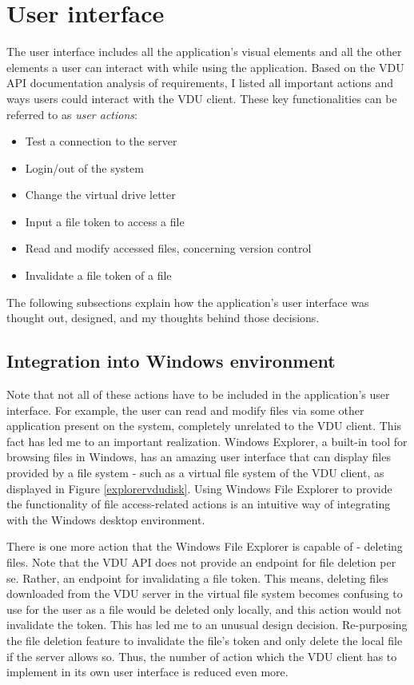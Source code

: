 \section{User interface}
The user interface includes all the application's visual elements and all the other elements a user can interact with while using the application. Based on the VDU API documentation analysis of requirements, I listed all important actions and ways users could interact with the VDU client. These key functionalities can be referred to as \textit{user actions}: 

\begin{itemize}
    \item Test a connection to the server
    \item Login/out of the system
    \item Change the virtual drive letter
    \item Input a file token to access a file
    \item Read and modify accessed files, concerning version control
    \item Invalidate a file token of a file
\end{itemize}

The following subsections explain how the application's user interface was thought out, designed, and my thoughts behind those decisions.

\subsection{Integration into Windows environment}

Note that not all of these actions have to be included in the application's user interface. For example, the user can read and modify files via some other application present on the system, completely unrelated to the VDU client. This fact has led me to an important realization. Windows Explorer, a built-in tool for browsing files in Windows, has an amazing user interface that can display files provided by a file system - such as a virtual file system of the VDU client, as displayed in Figure \ref{explorervdudisk}. 
Using Windows File Explorer to provide the functionality of file access-related actions is an intuitive way of integrating with the Windows desktop environment.

There is one more action that the Windows File Explorer is capable of - deleting files. Note that the VDU API does not provide an endpoint for file deletion per se. Rather, an endpoint for invalidating a file token. This means, deleting files downloaded from the VDU server in the virtual file system becomes confusing to use for the user as a file would be deleted only locally, and this action would not invalidate the token. This has led me to an unusual design decision. Re-purposing the file deletion feature to invalidate the file's token and only delete the local file if the server allows so. Thus, the number of action which the VDU client has to implement in its own user interface is reduced even more. 

